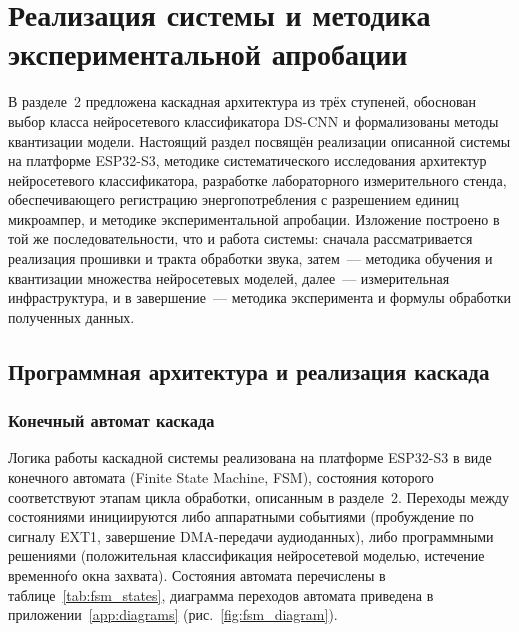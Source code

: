 
\section{Реализация системы и методика экспериментальной апробации}

В разделе~2 предложена каскадная архитектура из трёх ступеней,
обоснован выбор класса нейросетевого классификатора DS-CNN и
формализованы методы квантизации модели. Настоящий раздел
посвящён реализации описанной системы на платформе ESP32-S3,
методике систематического исследования архитектур
нейросетевого классификатора, разработке лабораторного
измерительного стенда, обеспечивающего регистрацию
энергопотребления с разрешением единиц микроампер, и методике
экспериментальной апробации. Изложение построено в той же
последовательности, что и работа системы: сначала рассматривается
реализация прошивки и тракта обработки звука, затем~--- методика
обучения и квантизации множества нейросетевых моделей,
далее~--- измерительная инфраструктура, и в завершение~---
методика эксперимента и формулы обработки полученных данных.

\subsection{Программная архитектура и реализация каскада}

\subsubsection{Конечный автомат каскада}

Логика работы каскадной системы реализована на платформе
ESP32-S3 в виде конечного автомата (Finite State Machine, FSM),
состояния которого соответствуют этапам цикла обработки,
описанным в разделе~2. Переходы между состояниями инициируются
либо аппаратными событиями (пробуждение по сигналу EXT1,
завершение DMA-передачи аудиоданных), либо программными
решениями (положительная классификация нейросетевой моделью,
истечение временно\'{г}о окна захвата). Состояния автомата
перечислены в таблице~\ref{tab:fsm_states}, диаграмма переходов
автомата приведена в приложении~\ref{app:diagrams}
(рис.~\ref{fig:fsm_diagram}).

